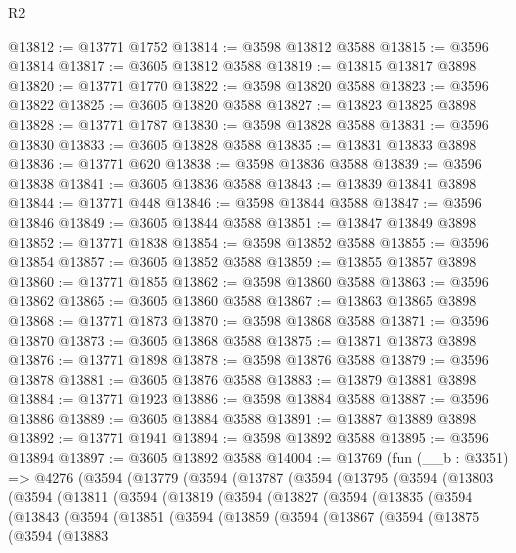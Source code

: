\begin{lexlean}{R2}
\begin{coremodule}
@13812 := @13771 @1752
@13814 := @3598 @13812 @3588
@13815 := @3596 @13814
@13817 := @3605 @13812 @3588
@13819 := @13815 @13817 @3898
@13820 := @13771 @1770
@13822 := @3598 @13820 @3588
@13823 := @3596 @13822
@13825 := @3605 @13820 @3588
@13827 := @13823 @13825 @3898
@13828 := @13771 @1787
@13830 := @3598 @13828 @3588
@13831 := @3596 @13830
@13833 := @3605 @13828 @3588
@13835 := @13831 @13833 @3898
@13836 := @13771 @620
@13838 := @3598 @13836 @3588
@13839 := @3596 @13838
@13841 := @3605 @13836 @3588
@13843 := @13839 @13841 @3898
@13844 := @13771 @448
@13846 := @3598 @13844 @3588
@13847 := @3596 @13846
@13849 := @3605 @13844 @3588
@13851 := @13847 @13849 @3898
@13852 := @13771 @1838
@13854 := @3598 @13852 @3588
@13855 := @3596 @13854
@13857 := @3605 @13852 @3588
@13859 := @13855 @13857 @3898
@13860 := @13771 @1855
@13862 := @3598 @13860 @3588
@13863 := @3596 @13862
@13865 := @3605 @13860 @3588
@13867 := @13863 @13865 @3898
@13868 := @13771 @1873
@13870 := @3598 @13868 @3588
@13871 := @3596 @13870
@13873 := @3605 @13868 @3588
@13875 := @13871 @13873 @3898
@13876 := @13771 @1898
@13878 := @3598 @13876 @3588
@13879 := @3596 @13878
@13881 := @3605 @13876 @3588
@13883 := @13879 @13881 @3898
@13884 := @13771 @1923
@13886 := @3598 @13884 @3588
@13887 := @3596 @13886
@13889 := @3605 @13884 @3588
@13891 := @13887 @13889 @3898
@13892 := @13771 @1941
@13894 := @3598 @13892 @3588
@13895 := @3596 @13894
@13897 := @3605 @13892 @3588
@14004 := @13769
    (fun (__b : @3351) =>
    @4276
      (@3594
        (@13779
          (@3594
            (@13787
              (@3594
                (@13795
                  (@3594
                    (@13803
                      (@3594
                        (@13811
                          (@3594
                            (@13819
                              (@3594
                                (@13827
                                  (@3594
                                    (@13835
                                      (@3594
                                        (@13843
                                          (@3594
                                            (@13851
                                              (@3594
                                                (@13859
                                                  (@3594
                                                    (@13867
                                                      (@3594
                                                        (@13875
                                                          (@3594
                                                            (@13883

\end{coremodule}
\end{lexlean}
